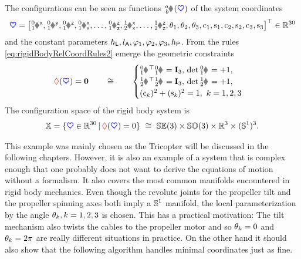 \begin{Example}
The configurations can be seen as functions $\bodyHomoCoord{\BidxI}{\BidxII}(\sysCoord)$ of the system coordinates
\begin{align}
 \sysCoord = \big[
  \bodyPosx{0}{1}, \bodyPosy{0}{1}, \bodyPosz{0}{1},
  \bodyRotxx{0}{1}, \ldots, \bodyRotzz{0}{1},
  \bodyRotxx{1}{2}, \ldots, \bodyRotzz{1}{2},
  \PropTilt[1], \PropTilt[2], \PropTilt[3],
  \cPropAngle[1], \sPropAngle[1],
  \cPropAngle[2], \sPropAngle[2],
  \cPropAngle[3], \sPropAngle[3]
 \big]^\top \in \RealNum^{30}
\end{align}
and the constant parameters $\LoadHeight, \ArmRadius, \ArmAngle[1], \ArmAngle[2], \ArmAngle[3], \PropHeight$.
From the rules \eqref{eq:rigidBodyRelCoordRules2} emerge the geometric constraints
\begin{align}\label{eq:TricopterExampleConstraint}
 \geoConstraint(\sysCoord) = \tuple{0} 
\qquad \cong \qquad 
 \begin{cases}
  \bodyRot{0}{1}^\top \bodyRot{0}{1} = \idMat[3], \, \det\bodyRot{0}{1} = +1, \\
  \bodyRot{1}{2}^\top \bodyRot{1}{2} = \idMat[3], \, \det\bodyRot{1}{2} = +1, \\
  (\cPropAngle[k])^2 + (\sPropAngle[k])^2 = 1, \ k=1,2,3
 \end{cases}
\end{align}
The configuration space of the rigid body system is
\begin{align}
 \configSpace = \{ \sysCoord \in \RealNum^{30} \, | \, \geoConstraint(\sysCoord) = 0 \} \ \cong \ \SpecialEuclideanGroup(3) \times \SpecialOrthogonalGroup(3) \times \RealNum^3 \times (\Sphere^1)^3.
\end{align}

This example was mainly chosen as the Tricopter will be discussed in the following chapters.
However, it is also an example of a system that is complex enough that one probably does not want to derive the equations of motion without a formalism.
It also covers the most common manifolds encountered in rigid body mechanics.
Even though the revolute joints for the propeller tilt and the propeller spinning axes both imply a $\Sphere^1$ manifold, the local parameterization by the angle $\aServo[k],k=1,2,3$ is chosen.
This has a practical motivation: The tilt mechanism also twists the cables to the propeller motor and so $\aServo[k] = 0$ and $\aServo[k] = 2\pi$ are really different situations in practice.
On the other hand it should also show that the following algorithm handles minimal coordinates just as fine.
\end{Example}

